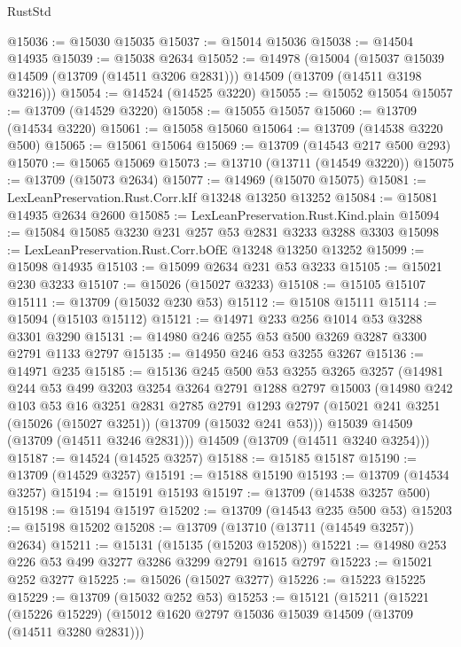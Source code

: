 \begin{lexlean}{RustStd}
\begin{coremodule}
@15036 := @15030 @15035
@15037 := @15014 @15036
@15038 := @14504 @14935
@15039 := @15038 @2634
@15052 := @14978
    (@15004
      (@15037 @15039 @14509 (@13709 (@14511 @3206 @2831)))
      @14509
      (@13709 (@14511 @3198 @3216)))
@15054 := @14524 (@14525 @3220)
@15055 := @15052 @15054
@15057 := @13709 (@14529 @3220)
@15058 := @15055 @15057
@15060 := @13709 (@14534 @3220)
@15061 := @15058 @15060
@15064 := @13709 (@14538 @3220 @500)
@15065 := @15061 @15064
@15069 := @13709 (@14543 @217 @500 @293)
@15070 := @15065 @15069
@15073 := @13710 (@13711 (@14549 @3220))
@15075 := @13709 (@15073 @2634)
@15077 := @14969 (@15070 @15075)
@15081 := LexLeanPreservation.Rust.Corr.kIf @13248 @13250 @13252
@15084 := @15081 @14935 @2634 @2600
@15085 := LexLeanPreservation.Rust.Kind.plain
@15094 := @15084 @15085 @3230 @231 @257 @53 @2831 @3233 @3288 @3303
@15098 := LexLeanPreservation.Rust.Corr.bOfE @13248 @13250 @13252
@15099 := @15098 @14935
@15103 := @15099 @2634 @231 @53 @3233
@15105 := @15021 @230 @3233
@15107 := @15026 (@15027 @3233)
@15108 := @15105 @15107
@15111 := @13709 (@15032 @230 @53)
@15112 := @15108 @15111
@15114 := @15094 (@15103 @15112)
@15121 := @14971 @233 @256 @1014 @53 @3288 @3301 @3290
@15131 := @14980 @246 @255 @53 @500 @3269 @3287 @3300 @2791 @1133 @2797
@15135 := @14950 @246 @53 @3255 @3267
@15136 := @14971 @235
@15185 := @15136
    @245
    @500
    @53
    @3255
    @3265
    @3257
    (@14981
      @244
      @53
      @499
      @3203
      @3254
      @3264
      @2791
      @1288
      @2797
      @15003
      (@14980
        @242
        @103
        @53
        @16
        @3251
        @2831
        @2785
        @2791
        @1293
        @2797
        (@15021 @241 @3251 (@15026 (@15027 @3251)) (@13709 (@15032 @241 @53)))
        @15039
        @14509
        (@13709 (@14511 @3246 @2831)))
      @14509
      (@13709 (@14511 @3240 @3254)))
@15187 := @14524 (@14525 @3257)
@15188 := @15185 @15187
@15190 := @13709 (@14529 @3257)
@15191 := @15188 @15190
@15193 := @13709 (@14534 @3257)
@15194 := @15191 @15193
@15197 := @13709 (@14538 @3257 @500)
@15198 := @15194 @15197
@15202 := @13709 (@14543 @235 @500 @53)
@15203 := @15198 @15202
@15208 := @13709 (@13710 (@13711 (@14549 @3257)) @2634)
@15211 := @15131 (@15135 (@15203 @15208))
@15221 := @14980 @253 @226 @53 @499 @3277 @3286 @3299 @2791 @1615 @2797
@15223 := @15021 @252 @3277
@15225 := @15026 (@15027 @3277)
@15226 := @15223 @15225
@15229 := @13709 (@15032 @252 @53)
@15253 := @15121
    (@15211
      (@15221
        (@15226 @15229)
        (@15012 @1620 @2797 @15036 @15039 @14509 (@13709 (@14511 @3280 @2831)))

\end{coremodule}
\end{lexlean}
